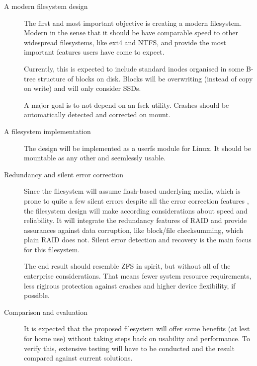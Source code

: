     \begin{description}
        \item[A modern filesystem design]

            The first and most important objective is creating a modern
            filesystem. Modern in the sense that it should be have comparable
            speed to other widespread filesystems, like ext4 and NTFS, and
            provide the most important features users have come to expect.

            Currently, this is expected to include standard inodes organised in
            some B-tree structure of blocks on disk. Blocks will be overwriting
            (instead of copy on write) and will only consider SSDs.

            A major goal is to not depend on an fsck utility. Crashes should be
            automatically detected and corrected on mount.

        \item[A filesystem implementation]

            The design will be implemented as a userfs module for Linux. It
            should be mountable as any other and seemlessly usable.

        \item[Redundancy and silent error correction]

            Since the filesystem will assume flash-based underlying media,
            which is prone to quite a few silent errors despite all the error
            correction features \cite{facebook_flash, google_flash}, the
            filesystem design will make according considerations about speed
            and reliability. It will integrate the redundancy features of RAID
            and provide assurances against data corruption, like block/file
            checksumming, which plain RAID does not. Silent error detection and
            recovery is the main focus for this filesystem.

            The end result should resemble ZFS in spirit, but without all of
            the enterprise considerations. That means fewer system resource
            requirements, less rigirous protection against crashes and higher
            device flexibility, if possible.

        \item[Comparison and evaluation]

            It is expected that the proposed filesystem will offer some
            benefits (at lest for home use) without taking steps back on
            usability and performance. To verify this, extensive testing will
            have to be conducted and the result compared against current
            solutions.


\end{description}
